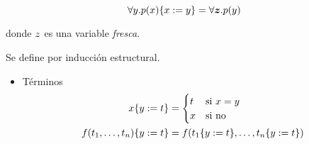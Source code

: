 \[
    \forall y . p(x)\{x := y\} =
    \forall \bm{z} . p(y)
\]

donde $z$ es una variable \textit{fresca}.

\begin{definition}
    Se define por inducción estructural.
    \begin{itemize}
        \item Términos
        \begin{align*}
            x\{y := t\} &= \begin{cases}
                t &\text{si } x = y\\
                x &\text{si no}
            \end{cases}\\
            f(t_1, \dots, t_n)\{y := t\} &=
                f(
                    t_1\{y := t\},
                    \dots,
                    t_n\{y := t\}
                )
        \end{align*}


\end{itemize}
\end{definition}
